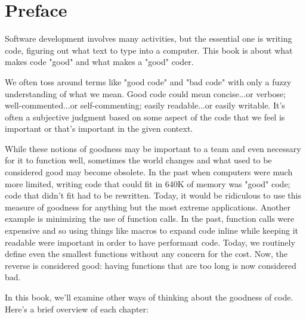 \chapter{Preface}
Software development involves many activities, but the essential one is writing
code, figuring out what text to type into a computer. This book is about what
makes code "good" and what makes a "good" coder.

We often toss around terms like "good code" and "bad code" with only a fuzzy
understanding of what we mean. Good code could mean concise...or verbose;
well-commented...or self-commenting; easily readable...or easily writable. It's
often a subjective judgment based on some aspect of the code that we feel is
important or that's important in the given context.

While these notions of goodness may be important to a team and even necessary
for it to function well, sometimes the world changes and what used to be
considered good may become obsolete. In the past when computers were much more
limited, writing code that could fit in 640K of memory was "good" code; code
that didn't fit had to be rewritten. Today, it would be ridiculous to use this
measure of goodness for anything but the most extreme applications. Another
example is minimizing the use of function calls. In the past, function calls
were expensive and so using things like macros to expand code inline while
keeping it readable were important in order to have performant code. Today, we
routinely define even the smallest functions without any concern for the cost.
Now, the reverse is considered good: having functions that are too long is now
considered bad.

In this book, we'll examine other ways of thinking about the goodness of code.
Here's a brief overview of each chapter:

